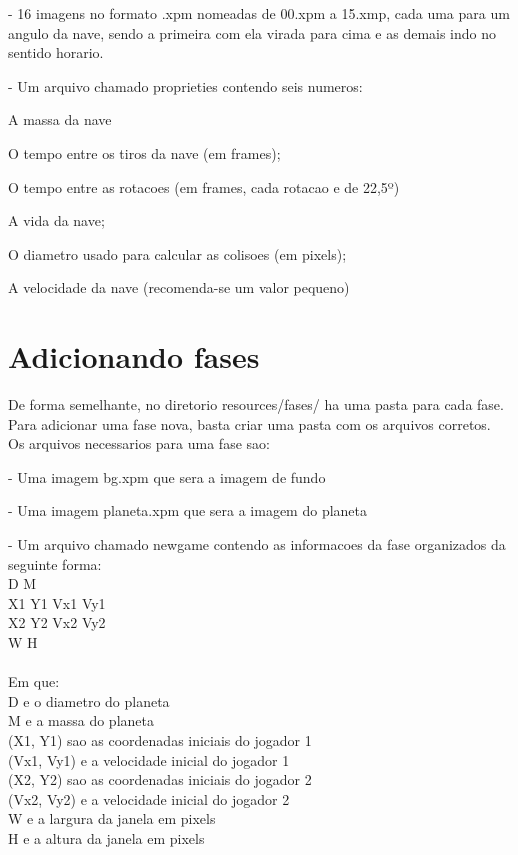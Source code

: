\documentclass[a4paper]{book}
\begin{document}
- 16 imagens no formato .xpm nomeadas de 00.xpm a 15.xmp, cada uma para um angulo da nave, sendo a primeira com ela virada para cima e as demais indo no sentido horario.

- Um arquivo chamado proprieties contendo seis numeros:

A massa da nave

O tempo entre os tiros da nave (em frames);

O tempo entre as rotacoes (em frames, cada rotacao e de 22,5º)

A vida da nave;

O diametro usado para calcular as colisoes (em pixels);

A velocidade da nave (recomenda-se um valor pequeno)

\section {Adicionando fases}
De forma semelhante, no diretorio resources/fases/ ha uma pasta para cada fase. Para adicionar uma fase nova, basta criar uma pasta com os arquivos corretos.
\\Os arquivos necessarios para uma fase sao:

- Uma imagem bg.xpm que sera a imagem de fundo

- Uma imagem planeta.xpm que sera a imagem do planeta

- Um arquivo chamado newgame contendo as informacoes da fase organizados da seguinte forma:
\\D M
\\X1 Y1 Vx1 Vy1
\\X2 Y2 Vx2 Vy2
\\W H
\\
\\Em que:
\\D e o diametro do planeta
\\M e a massa do planeta
\\(X1, Y1) sao as coordenadas iniciais do jogador 1
\\(Vx1, Vy1) e a velocidade inicial do jogador 1
\\(X2, Y2) sao as coordenadas iniciais do jogador 2
\\(Vx2, Vy2) e a velocidade inicial do jogador 2
\\W e a largura da janela em pixels
\\H e a altura da janela em pixels
\end{document}
